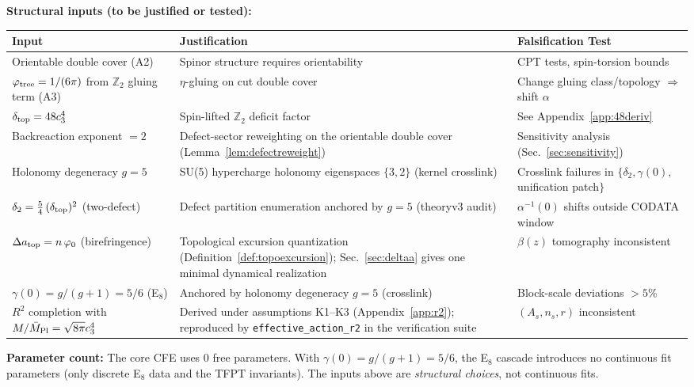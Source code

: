 \begin{tcolorbox}[colback=yellow!5, colframe=yellow!60!black, 
    title={\textbf{Assumption Ledger: Established vs.\ New}}, fonttitle=\bfseries]
\textbf{Structural inputs (to be justified or tested):}
\begin{center}
\begin{tabular}{@{}p{4cm}p{4cm}p{4.5cm}@{}}
\toprule
\textbf{Input} & \textbf{Justification} & \textbf{Falsification Test}\\
\midrule
Orientable double cover (A2) & Spinor structure requires orientability & CPT tests, spin-torsion bounds\\
$\varphi_{\mathrm{tree}} = 1/(6\pi)$ from $\mathbb{Z}_2$ gluing term (A3) & $\eta$-gluing on cut double cover & Change gluing class/topology $\Rightarrow$ shift $\alpha$\\
$\delta_{\mathrm{top}} = 48c_3^4$ & Spin-lifted $\mathbb{Z}_2$ deficit factor & See Appendix~\ref{app:48deriv}\\
Backreaction exponent $=2$ & Defect-sector reweighting on the orientable double cover (Lemma~\ref{lem:defectreweight}) & Sensitivity analysis (Sec.~\ref{sec:sensitivity})\\
Holonomy degeneracy $g=5$ & SU(5) hypercharge holonomy eigenspaces $\{3,2\}$ (kernel crosslink) & Crosslink failures in $\{\delta_2,\gamma(0),$ unification patch$\}$\\
$\delta_2=\frac54\,(\delta_{\mathrm{top}})^2$ (two-defect) & Defect partition enumeration anchored by $g=5$ (theoryv3 audit) & $\alpha^{-1}(0)$ shifts outside CODATA window\\
$\Delta a_{\text{top}} = n\,\varphi_0$ (birefringence) & Topological excursion quantization (Definition~\ref{def:topoexcursion}); Sec.~\ref{sec:deltaa} gives one minimal dynamical realization & $\beta(z)$ tomography inconsistent\\
$\gamma(0)=g/(g+1)=5/6$ (E$_8$) & Anchored by holonomy degeneracy $g=5$ (crosslink) & Block-scale deviations $>5\%$\\
$R^2$ completion with $M/\bar{M}_{\mathrm{Pl}}=\sqrt{8\pi}c_3^4$ & Derived under assumptions K1--K3 (Appendix~\ref{app:r2}); reproduced by \texttt{effective\_action\_r2} in the verification suite & $(A_s,n_s,r)$ inconsistent\\
\bottomrule
\end{tabular}
\end{center}

\textbf{Parameter count:} The core CFE uses 0 free parameters. With $\gamma(0)=g/(g+1)=5/6$, the E$_8$ cascade 
introduces no continuous fit parameters (only discrete E$_8$ data and the TFPT invariants). 
The inputs above are \emph{structural choices}, not continuous fits.
\end{tcolorbox}

